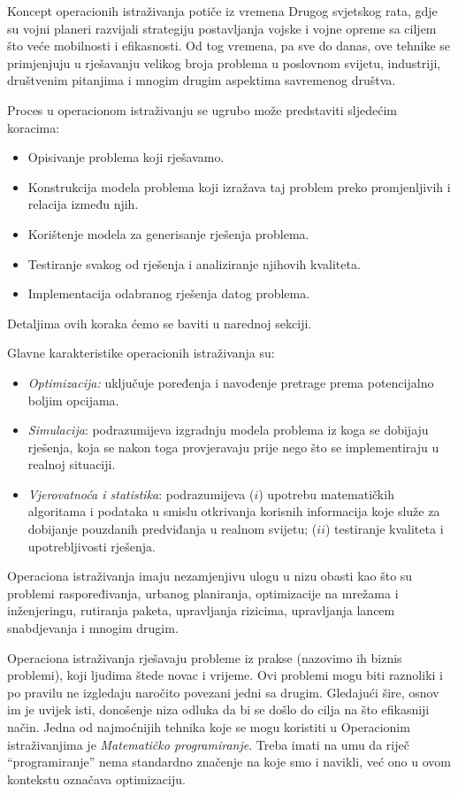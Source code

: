 \documentclass[a4paper, utf8, 11pt, colorlinks]{book}
\theoremstyle{definition}
\begin{document}
Koncept operacionih istraživanja potiče iz vremena Drugog svjetskog rata, gdje su vojni planeri razvijali strategiju postavljanja vojske i vojne opreme sa ciljem što veće mobilnosti i efikasnosti. Od tog vremena, pa sve do danas, ove tehnike se primjenjuju u rješavanju velikog broja problema u poslovnom svijetu, industriji, društvenim pitanjima i mnogim drugim aspektima savremenog društva. 

Proces u operacionom istraživanju se ugrubo može predstaviti sljedećim koracima:
\begin{itemize}
    \item Opisivanje problema koji rješavamo.
    \item Konstrukcija modela problema koji izražava taj problem preko promjenljivih i relacija između njih. 
    \item Korištenje modela za generisanje rješenja problema.
    \item Testiranje svakog od rješenja i analiziranje njihovih  kvaliteta.
    \item Implementacija odabranog rješenja datog problema. 
\end{itemize}
Detaljima ovih koraka ćemo se baviti  u narednoj sekciji.
 
Glavne karakteristike operacionih istraživanja su:
\begin{itemize}
    \item \emph{Optimizacija:} %
     uključuje poređenja i navođenje pretrage prema potencijalno boljim opcijama.
    \item \emph{Simulacija}:  podrazumijeva izgradnju modela problema iz koga se dobijaju rješenja, koja se nakon toga provjeravaju prije nego što se implementiraju u realnoj situaciji.
    \item \emph{Vjerovatnoća i statistika}:  podrazumijeva ($i$) upotrebu matematičkih algoritama i podataka u smislu otkrivanja korisnih informacija koje služe za dobijanje pouzdanih predviđanja u realnom svijetu; ($ii$) testiranje kvaliteta i upotrebljivosti rješenja.
\end{itemize}
 
 Operaciona istraživanja imaju nezamjenjivu ulogu u nizu obasti kao što su problemi raspoređivanja, urbanog planiranja, optimizacije na mrežama i inženjeringu, rutiranja paketa, upravljanja rizicima, upravljanja lancem snabdjevanja i mnogim drugim. 

 Operaciona istraživanja rješavaju probleme iz prakse (nazovimo ih biznis problemi), koji ljudima štede novac i vrijeme. Ovi problemi mogu biti raznoliki i po pravilu ne izgledaju naročito povezani jedni sa drugim. Gledajući šire, osnov  im je uvijek isti, donošenje niza odluka da bi se došlo do cilja na što efikasniji način.
Jedna od najmoćnijih tehnika koje se mogu koristiti u Operacionim istraživanjima je \emph{Matematičko programiranje}. Treba imati na umu da riječ ``programiranje'' nema standardno značenje na koje smo i navikli, već ono u ovom kontekstu označava optimizaciju.   %
\end{document}

